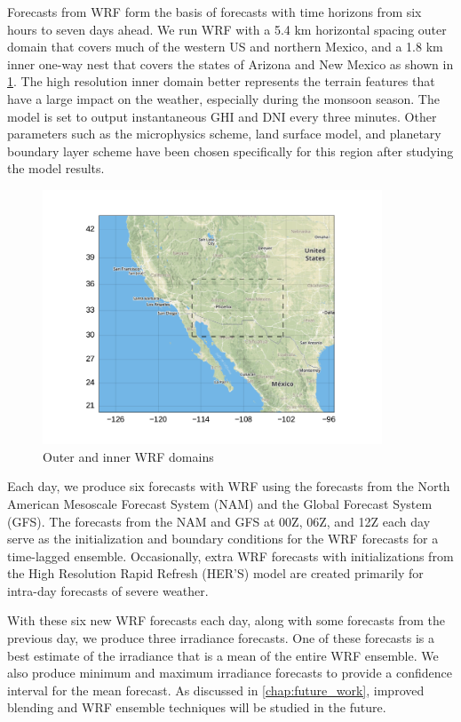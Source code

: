 Forecasts from WRF form the basis of forecasts with time horizons from
six hours to seven days ahead.
We run WRF with a 5.4 km horizontal spacing outer domain that covers
much of the western US and northern Mexico, and a 1.8 km inner one-way
nest that covers the states of Arizona and New Mexico as shown in
\cref{fig:wrfdomains}.
The high resolution inner domain better represents the terrain
features that have a large impact on the weather, especially during
the monsoon season.
The model is set to output instantaneous GHI and DNI every three minutes.
Other parameters such as the microphysics scheme, land surface model,
and planetary boundary layer scheme have been chosen specifically for
this region after studying the model results.

\begin{figure}[htb]
\centering
\includegraphics[width=0.9\textwidth]{figs/domains.pdf}
\vspace{-1.5em}
\caption{Outer and inner WRF domains}
\label{fig:wrfdomains}
\end{figure}

Each day, we produce six forecasts with WRF using the forecasts from
the North American Mesoscale Forecast System (NAM) and the Global
Forecast System (GFS).
The forecasts from the NAM and GFS at 00Z, 06Z, and 12Z each day serve
as the initialization and boundary conditions for the WRF forecasts for
a time-lagged ensemble.
Occasionally, extra WRF forecasts with initializations from the High
Resolution Rapid Refresh (HER'S) model are created primarily for
intra-day forecasts of severe weather.

With these six new WRF forecasts each day, along with some forecasts
from the previous day, we produce three irradiance forecasts.
One of these forecasts is a best estimate of the irradiance that is a
mean of the entire WRF ensemble.
We also produce minimum and maximum irradiance forecasts to provide a
confidence interval for the mean forecast.
As discussed in \cref{chap:future_work}, improved blending and WRF
ensemble techniques will be studied in the future.

